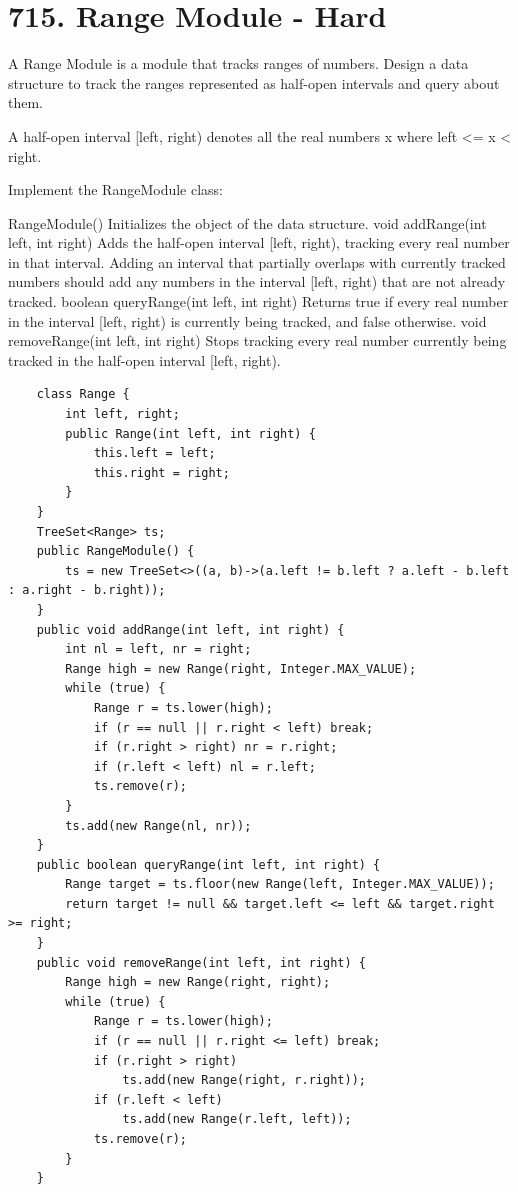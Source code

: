 \documentclass[9pt, b5paaper]{book}
\begin{document}
\section{715. Range Module - Hard}
\label{sec-19-4}
A Range Module is a module that tracks ranges of numbers. Design a data structure to track the ranges represented as half-open intervals and query about them.

A half-open interval [left, right) denotes all the real numbers x where left <= x < right.

Implement the RangeModule class:

RangeModule() Initializes the object of the data structure.
void addRange(int left, int right) Adds the half-open interval [left, right), tracking every real number in that interval. Adding an interval that partially overlaps with currently tracked numbers should add any numbers in the interval [left, right) that are not already tracked.
boolean queryRange(int left, int right) Returns true if every real number in the interval [left, right) is currently being tracked, and false otherwise.
void removeRange(int left, int right) Stops tracking every real number currently being tracked in the half-open interval [left, right).
\begin{verbatim}
    class Range {
        int left, right;
        public Range(int left, int right) {
            this.left = left;
            this.right = right;
        }
    }
    TreeSet<Range> ts;
    public RangeModule() {
        ts = new TreeSet<>((a, b)->(a.left != b.left ? a.left - b.left : a.right - b.right));
    }
    public void addRange(int left, int right) {
        int nl = left, nr = right;
        Range high = new Range(right, Integer.MAX_VALUE);
        while (true) {
            Range r = ts.lower(high);
            if (r == null || r.right < left) break;
            if (r.right > right) nr = r.right;
            if (r.left < left) nl = r.left;
            ts.remove(r);
        }
        ts.add(new Range(nl, nr));
    }
    public boolean queryRange(int left, int right) {
        Range target = ts.floor(new Range(left, Integer.MAX_VALUE));
        return target != null && target.left <= left && target.right >= right;
    }
    public void removeRange(int left, int right) {
        Range high = new Range(right, right);
        while (true) {
            Range r = ts.lower(high);
            if (r == null || r.right <= left) break;
            if (r.right > right)
                ts.add(new Range(right, r.right));
            if (r.left < left)
                ts.add(new Range(r.left, left));
            ts.remove(r);
        }
    }
\end{verbatim}
\end{document}
